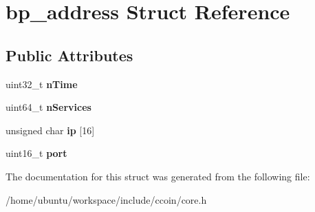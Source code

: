 \hypertarget{structbp__address}{\section{bp\-\_\-address Struct Reference}
\label{structbp__address}
}
\subsection*{Public Attributes}
\begin{DoxyCompactItemize}
\item 
\hypertarget{structbp__address_afb1ff2a008ee62a840417d05db9c7b8c}{uint32\-\_\-t {\bfseries n\-Time}}\label{structbp__address_afb1ff2a008ee62a840417d05db9c7b8c}

\item 
\hypertarget{structbp__address_ab4bc7a5da56ffb3733962bfe23c4424c}{uint64\-\_\-t {\bfseries n\-Services}}\label{structbp__address_ab4bc7a5da56ffb3733962bfe23c4424c}

\item 
\hypertarget{structbp__address_a8c9cb68145eafd487e3d638a50636a7d}{unsigned char {\bfseries ip} \mbox{[}16\mbox{]}}\label{structbp__address_a8c9cb68145eafd487e3d638a50636a7d}

\item 
\hypertarget{structbp__address_a6a449c4d9f3373dea0487376cd44ffef}{uint16\-\_\-t {\bfseries port}}\label{structbp__address_a6a449c4d9f3373dea0487376cd44ffef}

\end{DoxyCompactItemize}


The documentation for this struct was generated from the following file\-:\begin{DoxyCompactItemize}
\item 
/home/ubuntu/workspace/include/ccoin/core.\-h\end{DoxyCompactItemize}
